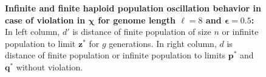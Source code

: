 \begin{figure}[h]
\begin{center}
\hspace{-3em}%
\vspace{-0.5em} \hspace{-3em}%


\caption{\textbf{Infinite and finite haploid population oscillation behavior in case of violation in $\bm{\chi}$ for genome length $\ell = 8$ and $\bm{\epsilon} = 0.5$:} 
  In left column, $d'$ is distance of finite population of size $n$ or infinite population to limit $\bm{z}^\ast$ for $g$ generations. In right column, $d$ is distance of finite population or infinite population to limits $\bm{p}^\ast$ and $\bm{q}^\ast$ without violation.}
\label{oscillation_8h_vio_chi_0.5}
\end{center}
\end{figure}


